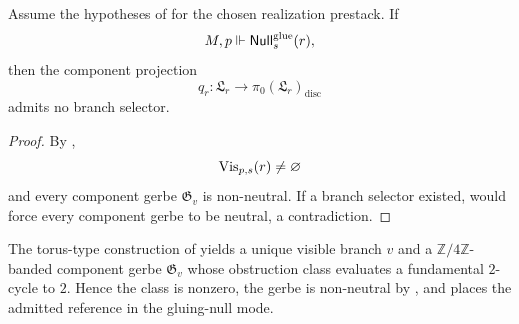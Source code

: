 \begin{corollary}\label{cor:no-branch-selector}
Assume the hypotheses of  for the chosen realization prestack. If
\[
M,p\Vdash \mathsf{Null}^{\mathrm{glue}}_s(r),
\]
then the component projection
\[
q_r:\mathfrak L_r\to \pi_0(\mathfrak L_r)_{\mathrm{disc}}
\]
admits no branch selector.
\end{corollary}

\begin{proof}
By ,
\[
\mathrm{Vis}_{p,s}(r)\neq\varnothing
\]
and every component gerbe $\mathfrak G_v$ is non-neutral. If a branch selector existed,  would force every component gerbe to be neutral, a contradiction.
\end{proof}

\begin{example}\label{ex:torus-gerbe}
The torus-type construction of  yields a unique visible branch $v$ and a $\mathbb Z/4\mathbb Z$-banded component gerbe $\mathfrak G_v$ whose obstruction class evaluates a fundamental $2$-cycle to $2$. Hence the class is nonzero, the gerbe is non-neutral by , and  places the admitted reference in the gluing-null mode.
\end{example}
